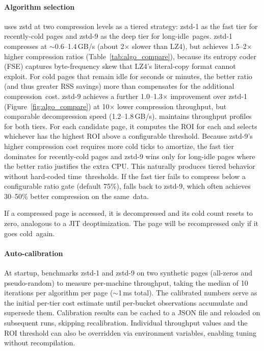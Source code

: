 \paragraph{Algorithm selection}
\sys uses zstd at two compression levels as a tiered strategy:
zstd-1 as the fast tier for recently-cold pages and zstd-9 as the
deep tier for long-idle~pages.  zstd-1 compresses at
$\sim$0.6--1.4\,GB/s (about 2$\times$ slower than LZ4), but
achieves 1.5--2$\times$ higher compression ratios
(Table~\ref{tab:algo_compare}), because its entropy coder (FSE)
captures byte-frequency skew that LZ4's literal-copy format cannot
exploit.  For cold pages that remain idle for seconds or minutes,
the better ratio (and thus greater RSS savings) more than
compensates for the additional compression~cost.
zstd-9 achieves a further 1.0--1.3$\times$ improvement over zstd-1
(Figure~\ref{fig:algo_compare}) at 10$\times$ lower compression
throughput, but comparable decompression speed (1.2--1.8\,GB/s).
\sys maintains throughput profiles for both tiers.  For each
candidate page, it computes the ROI for each and selects whichever
has the highest ROI above a configurable threshold.  Because zstd-9's
higher compression cost requires more cold ticks to amortize, the
fast tier dominates for recently-cold pages and zstd-9 wins only for
long-idle pages where the better ratio justifies the extra CPU\@.
This naturally produces tiered behavior without hard-coded
time~thresholds.  If the fast tier fails to compress below a
configurable ratio gate (default 75\%), \sys falls back to zstd-9,
which often achieves 30--50\% better compression on the same~data.

If a compressed page is accessed, it is decompressed and its cold
count resets to zero, analogous to a JIT deoptimization.  The page
will be recompressed only if it goes cold~again.

\paragraph{Auto-calibration}
At startup, \sys benchmarks zstd-1 and zstd-9 on two synthetic
pages (all-zeros and pseudo-random) to measure per-machine
throughput, taking the median of 10 iterations per algorithm per
page ($\sim$1\,ms total).  The calibrated numbers serve as the
initial per-tier cost estimate until per-bucket observations
accumulate and supersede them.  Calibration results can be cached
to a JSON file and reloaded on subsequent runs, skipping
recalibration.  Individual throughput values and the ROI threshold
can also be overridden via environment variables, enabling tuning
without recompilation.

